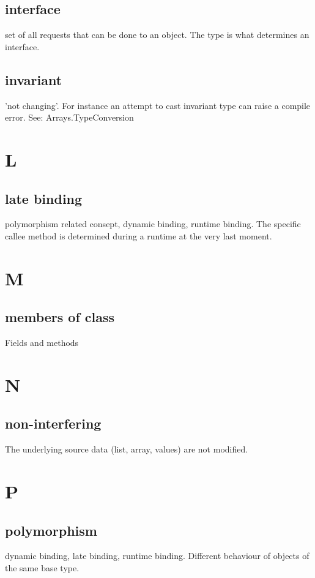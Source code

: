 \documentclass{report}
\begin{document}
\subsection{interface}
set of all requests that can be done to an object. The type is what determines an interface.

\subsection{invariant}
'not changing'. For instance an attempt to cast invariant type can raise a compile error. See: Arrays.TypeConversion

\section{L}

\subsection{late binding}
polymorphism related consept, dynamic binding, runtime binding. The specific callee method is determined during a runtime at the very last moment.


\section{M}

\subsection{members of class}
Fields and methods


\section{N}

\subsection{non-interfering}
The underlying source data (list, array, values) are not modified.


\section{P}

\subsection{polymorphism}
dynamic binding, late binding, runtime binding. Different behaviour of objects of the same base type.
\end{document}

